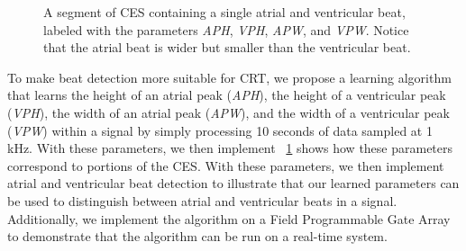\documentclass[conference]{IEEEtran}
\newcommand{\APW}{\textit{APW}}
\newcommand{\VPW}{\textit{VPW}}
\newcommand{\APH}{\textit{APH}}
\newcommand{\VPH}{\textit{VPH}}
\begin{document}
\begin{figure}
	\centering
	\caption{
	A segment of CES containing a single atrial and ventricular beat, labeled with the parameters \APH, \VPH, \APW, and \VPW. 
	Notice that the atrial beat is wider but smaller than the ventricular beat.}
	\label{fig:singlebeat}
\end{figure}
To make beat detection more suitable for CRT,
we propose a learning algorithm that learns the
height of an atrial peak (\APH), the height of a ventricular
peak (\VPH), the width of an atrial peak (\APW), and the
width of a ventricular peak (\VPW) within a signal 
by simply processing 10 seconds of data sampled
at 1 kHz. With these parameters, we then implement
\figurename~\ref{fig:singlebeat} shows how these parameters correspond to portions of the CES.  %
With these parameters, we then implement
atrial and ventricular beat detection to illustrate that our
learned parameters can be used to distinguish between
atrial and ventricular beats in a signal.
Additionally, we implement the algorithm on a Field
Programmable Gate Array to demonstrate that the
algorithm can be run on a real-time system.
\end{document}
